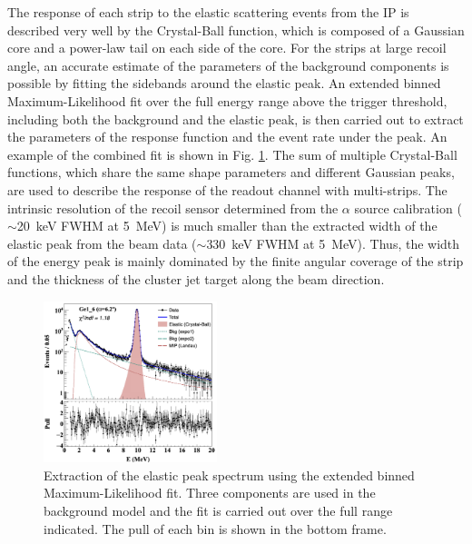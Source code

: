 \documentclass[number,5p]{elsarticle}
\begin{document}
The response of each strip to the elastic scattering events from the IP is described
very well by the Crystal-Ball function\cite{crystal_ball}, which is composed of a Gaussian core and a power-law tail on each side of the core.
For the strips at large recoil angle, an accurate estimate of the parameters of
the background components is possible by fitting the sidebands around the elastic peak.
An extended binned Maximum-Likelihood fit over the full energy range above the
trigger threshold, including both the background and the
elastic peak, is then carried out to extract the parameters of the response function and the event rate under the peak.
An example of the combined fit is shown in Fig. \ref{fig:e_fit}.
The sum of multiple Crystal-Ball functions, which share the same shape parameters and
different Gaussian peaks, are used to describe the response of the readout channel with multi-strips. 
The intrinsic resolution of the recoil sensor determined from the $\alpha$ source
calibration ($\sim$\SI{20}{\keV} FWHM at \SI{5}{\MeV}) is much smaller than the
extracted width of the elastic peak from the beam data ($\sim$\SI{330}{\keV}
FWHM at \SI{5}{\MeV}).
Thus, the width of the energy peak is mainly dominated by the finite
angular coverage of the strip and the thickness of the cluster jet target along the beam direction.
\begin{figure}[tb!]
  \centering
  \includegraphics[width=0.45\textwidth]{./e_fit.png}
  \caption{Extraction of the elastic peak spectrum using the extended binned
    Maximum-Likelihood fit. Three components are used in the background model
    and the fit is carried out over the full range indicated. The pull of each bin
    is shown in the bottom frame.}
  \label{fig:e_fit}
\end{figure}
\end{document}
